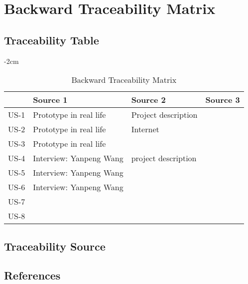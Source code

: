 \documentclass[12pt]{report}
\begin{document}
{\chapter{Backward Traceability Matrix } 

\section{Traceability Table}
\begin{table}[!ht]
\centering
\addtolength{\leftskip} {-2cm}
\addtolength{\rightskip}{-2cm}

\begin{tabular}{|p{2cm}|p{4cm}|p{4cm}|p{4cm}|}

\hline
& Source 1& Source 2 & Source 3 \\
\hline
US-1 & Prototype in real life & Project description& \\
\hline
US-2 & Prototype in real life&Internet&\\
\hline
US-3& Prototype in real life&&\\
\hline
US-4& Interview: Yanpeng Wang&project description& \\
\hline
US-5& Interview: Yanpeng Wang &&\\
\hline

US-6& Interview: Yanpeng Wang &&\\
\hline

US-7&&&\\
\hline

US-8&&&\\
\hline

\hline

\end{tabular}
\caption{Backward Traceability Matrix}
\end{table}

\section{Traceability Source}


\newpage
\section*{References}
}
\end{document}
